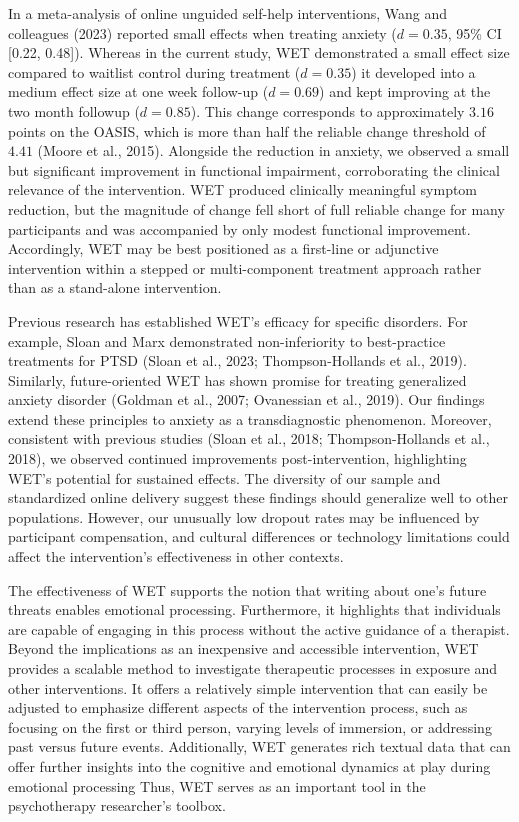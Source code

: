\documentclass[
  man,floatsintext]{apa7}
\begin{document}
In a meta-analysis of online unguided self-help interventions, Wang and colleagues (2023)
reported small effects when treating anxiety (\(d = 0.35\), 95\% CI {[}0.22, 0.48{]}).
Whereas in the current study, WET demonstrated a small effect size compared to waitlist control during treatment (\(d = 0.35\)) it developed into a medium effect size at one week follow-up (\(d = 0.69\)) and kept improving at the two month followup (\(d = 0.85\)).
This change corresponds to approximately \(3.16\) points on the OASIS, which is more than half the reliable change threshold of \(4.41\) (Moore et al., 2015).
Alongside the reduction in anxiety, we observed a small but significant improvement in functional impairment, corroborating the clinical relevance of the intervention.
WET produced clinically meaningful symptom reduction, but the magnitude of change fell short of full reliable change for many participants and was accompanied by only modest functional improvement.
Accordingly, WET may be best positioned as a first-line or adjunctive intervention within a stepped or multi-component treatment approach rather than as a stand-alone intervention.

Previous research has established WET's efficacy for specific disorders.
For example, Sloan and Marx demonstrated non-inferiority to best-practice treatments for PTSD (Sloan et al., 2023; Thompson-Hollands et al., 2019).
Similarly, future-oriented WET has shown promise for treating generalized anxiety disorder (Goldman et al., 2007; Ovanessian et al., 2019).
Our findings extend these principles to anxiety as a transdiagnostic phenomenon.
Moreover, consistent with previous studies (Sloan et al., 2018; Thompson-Hollands et al., 2018), we observed continued improvements post-intervention, highlighting WET's potential for sustained effects.
The diversity of our sample and standardized online delivery suggest these findings should generalize well to other populations.
However, our unusually low dropout rates may be influenced by participant compensation, and cultural differences or technology limitations could affect the intervention's effectiveness in other contexts.

The effectiveness of WET supports the notion that writing about one's future threats enables emotional processing.
Furthermore, it highlights that individuals are capable of engaging in this process without the active guidance of a therapist.
Beyond the implications as an inexpensive and accessible intervention, WET provides a scalable method to investigate therapeutic processes in exposure and other interventions.
It offers a relatively simple intervention that can easily be adjusted to emphasize different aspects of the intervention process, such as focusing on the first or third person, varying levels of immersion, or addressing past versus future events.
Additionally, WET generates rich textual data that can offer further insights into the cognitive and emotional dynamics at play during emotional processing
Thus, WET serves as an important tool in the psychotherapy researcher's toolbox.
\end{document}
